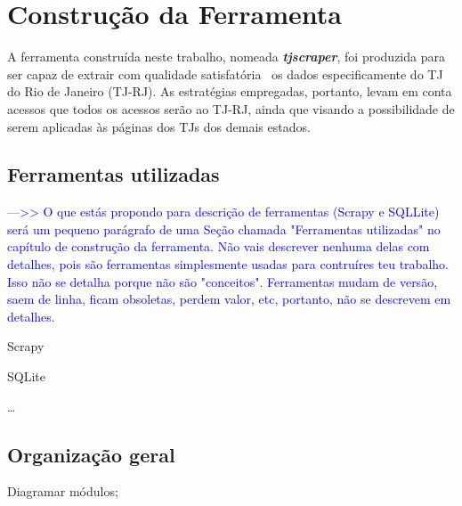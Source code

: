 \chapter{Construção da Ferramenta~\label{chp:construção-da-ferramenta}}

A ferramenta construída neste trabalho, nomeada \textit{\textbf{tjscraper}},
foi produzida para ser capaz de extrair com qualidade
satisfatória~ os dados especificamente do TJ do Rio de
Janeiro (TJ-RJ). As estratégias empregadas, portanto, levam em conta acessos
que todos os acessos serão ao TJ-RJ, ainda que visando a possibilidade de serem
aplicadas às páginas dos TJs dos demais estados.

\section{Ferramentas utilizadas~\label{section:ferramentas-utilizadas}}

\textcolor{blue}{--->> O que estás propondo para descrição de ferramentas
(Scrapy e SQLLite) será um pequeno parágrafo de uma Seção chamada "Ferramentas
utilizadas" no capítulo de construção da ferramenta. Não vais descrever nenhuma
delas com detalhes, pois são ferramentas simplesmente usadas para contruíres
teu trabalho. Isso não se detalha porque não são "conceitos". Ferramentas mudam
de versão, saem de linha, ficam obsoletas, perdem valor, etc, portanto, não se
descrevem em detalhes.}

\begin{todolist}
    \item Scrapy
    \item SQLite
    \item \ldots
\end{todolist}

\section{Organização geral}

\begin{todolist}
    \item Diagramar módulos;
\end{todolist}

